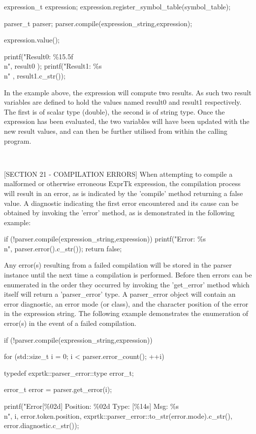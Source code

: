 {expression\_t expression;
expression.register\_symbol\_table(symbol\_table);

parser\_t parser;
parser.compile(expression\_string,expression);

expression.value();

printf("Result0: \%15.5f\\n", result0        );
printf("Result1: \%s\\n"    , result1.c\_str());


In the example above, the expression will compute two results. As such
two result variables are defined to hold the values named result0  and
result1 respectively. The first is of scalar type (double), the second
is of  string type.  Once the  expression has  been evaluated, the two
variables will have been updated  with the new result values,  and can
then be further utilised from within the calling program.

~~~~~~~~~~~~~~~~~~~~~~~~~~~~~~~~~~~~~~~~~~~~~~~~~~~~~~~~~~

[SECTION 21 - COMPILATION ERRORS]
When attempting to compile  a malformed or otherwise  erroneous ExprTk
expression, the  compilation process  will result  in an  error, as is
indicated  by  the  'compile'  method  returning  a  false  value.   A
diagnostic indicating the first error encountered and its cause can be
obtained by  invoking the  'error' method,  as is  demonstrated in the
following example:

if (!parser.compile(expression\_string,expression))
{
	printf("Error: \%s\\n", parser.error().c\_str());
	return false;
}


Any error(s) resulting from a failed compilation will be stored in the
parser instance until the next time a compilation is performed. Before
then errors can be enumerated  in the order they occurred  by invoking
the 'get\_error' method which itself will return a 'parser\_error' type.
A parser\_error object will contain an error diagnostic, an error  mode
(or class), and the character position of the error in the  expression
string. The following example demonstrates the enumeration of error(s)
in the event of a failed compilation.

if (!parser.compile(expression\_string,expression))
{
	for (std::size\_t i = 0; i < parser.error\_count(); ++i)
	{
		typedef exprtk::parser\_error::type error\_t;
		
		error\_t error = parser.get\_error(i);
		
		printf("Error[\%02d] Position: \%02d Type: [\%14s] Msg: \%s\\n",
		i,
		error.token.position,
		exprtk::parser\_error::to\_str(error.mode).c\_str(),
		error.diagnostic.c\_str());
	}
	
}}
